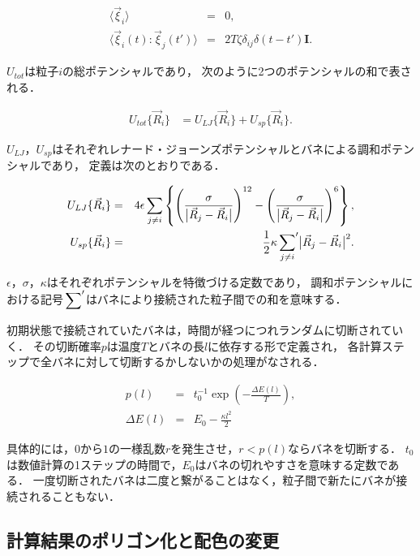 \begin{eqnarray}
\label{eq:langevin0}
\langle\vec{\xi}_i\rangle &=& 0, \\
\label{eq:langevin1}
\langle\vec{\xi}_i(t):\vec{\xi}_j(t')\rangle &=& 2T\zeta\delta_{ij}\delta(t-t')\bm{I}.
\end{eqnarray}

$U_{tot}$は粒子$i$の総ポテンシャルであり，
次のように2つのポテンシャルの和で表される．

\begin{eqnarray}
U_{tot}\{\vec{R}_i\}
&=
 U_{LJ}\{\vec{R}_i\}
+U_{sp}\{\vec{R}_i\}.
\end{eqnarray}

$U_{LJ}$，$U_{sp}$はそれぞれレナード・ジョーンズポテンシャルとバネによる調和ポテンシャルであり，
定義は次のとおりである．

\begin{eqnarray}
U_{LJ}\{\vec{R}_i\}
&=&
4\epsilon\sum_{j\neq i}
\left\{
\left(
\frac{\sigma}{\bigl|\vec{R}_j-\vec{R}_i\bigr|}
\right)^{12}
-
\left(
\frac{\sigma}{\bigl|\vec{R}_j-\vec{R}_i\bigr|}
\right)^{6}
\right\},
\\
U_{sp}\{\vec{R}_i\}
&=&
\frac{1}{2}
\kappa
\sideset{}{'}\sum_{j\neq i}
\bigl|\vec{R}_j-\vec{R}_i\bigr|^{2}.
\end{eqnarray}

$\epsilon$，$\sigma$，$\kappa$はそれぞれポテンシャルを特徴づける定数であり，
調和ポテンシャルにおける記号$\sideset{}{'}\sum$はバネにより接続された粒子間での和を意味する．

初期状態で接続されていたバネは，時間が経つにつれランダムに切断されていく．
その切断確率$p$は温度$T$とバネの長$l$に依存する形で定義され，
各計算ステップで全バネに対して切断するかしないかの処理がなされる．

\begin{eqnarray}
p(l)
&=&
t_0^{-1}
\exp\left(-\frac{\Delta E(l)}{T}\right)
,\\
\Delta E(l)
&=&
E_0-\frac{\kappa l^2}{2}
\end{eqnarray}

具体的には，$0$から$1$の一様乱数$r$を発生させ，$r<p(l)$ならバネを切断する．
$t_0$は数値計算の1ステップの時間で，$E_0$はバネの切れやすさを意味する定数である．
一度切断されたバネは二度と繋がることはなく，粒子間で新たにバネが接続されることもない．


\subsection{計算結果のポリゴン化と配色の変更}

